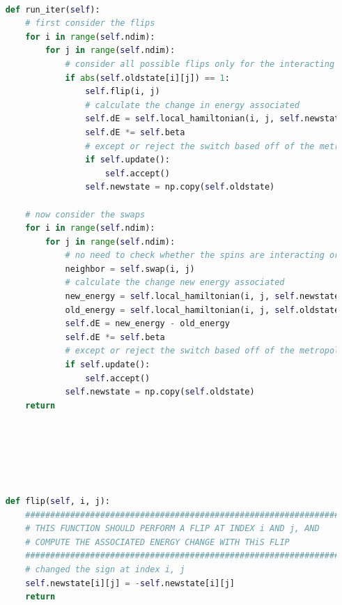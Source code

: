 \documentclass[12pt]{article}
\begin{document}
\begin{lstlisting}[language=Python]
    
    def run_iter(self):
        # first consider the flips
        for i in range(self.ndim):
            for j in range(self.ndim):
                # consider all possible flips only for the interacting spins
                if abs(self.oldstate[i][j]) == 1:
                    self.flip(i, j)
                    # calculate the change in energy associated
                    self.dE = self.local_hamiltonian(i, j, self.newstate) - self.local_hamiltonian(i, j, self.oldstate)
                    self.dE *= self.beta
                    # except or reject the switch based off of the metropolis-hastings algorithm
                    if self.update():
                        self.accept()
                    self.newstate = np.copy(self.oldstate)
                    
        # now consider the swaps
        for i in range(self.ndim):
            for j in range(self.ndim):
                # no need to check whether the spins are interacting or not
                neighbor = self.swap(i, j)
                # calculate the change new energy associated
                new_energy = self.local_hamiltonian(i, j, self.newstate) + self.local_hamiltonian(neighbor[0], neighbor[1], self.newstate)
                old_energy = self.local_hamiltonian(i, j, self.oldstate) + self.local_hamiltonian(neighbor[0], neighbor[1], self.oldstate)
                self.dE = new_energy - old_energy
                self.dE *= self.beta
                # except or reject the switch based off of the metropolis-hastings algorithm
                if self.update():
                    self.accept()
                self.newstate = np.copy(self.oldstate)       
        return

        
                

            
    
    def flip(self, i, j):
        ################################################################
        # THIS FUNCTION SHOULD PERFORM A FLIP AT INDEX i AND j, AND    #
        # COMPUTE THE ASSOCIATED ENERGY CHANGE WITH THiS FLIP          #
        ################################################################
        # changed the sign at index i, j
        self.newstate[i][j] = -self.newstate[i][j]
        return




\end{lstlisting}
\end{document}
